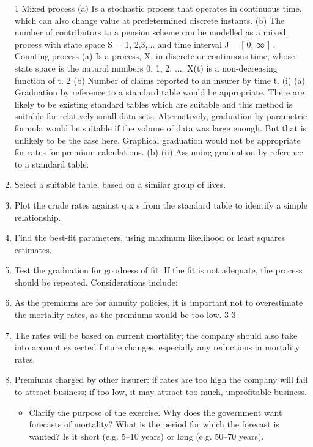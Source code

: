 \documentclass[a4paper,12pt]{article}
\begin{document}
\begin{enumerate}
1
Mixed process
(a) Is a stochastic process that operates in continuous time, which can also change
value at predetermined discrete instants.
(b) The number of contributors to a pension scheme can be modelled as a mixed
process with state space S = { 1, 2,3,... } and time interval J = [ 0, ∞ ] .
Counting process
(a)
Is a process, X, in discrete or continuous time, whose state space is the natural
numbers {0, 1, 2, ...}.
X(t) is a non-decreasing function of t.
2
(b) Number of claims reported to an insurer by time t.
(i) (a)
Graduation by reference to a standard table would be appropriate.
There are likely to be existing standard tables which are suitable and
this method is suitable for relatively small data sets.
Alternatively, graduation by parametric formula would be suitable if
the volume of data was large enough. But that is unlikely to be the
case here.
Graphical graduation would not be appropriate for rates for premium
calculations.
(b)
(ii)
Assuming graduation by reference to a standard table:
\item Select a suitable table, based on a similar group of lives.
\item Plot the crude rates against q x s from the standard table to identify a
simple relationship.
\item Find the best-fit parameters, using maximum likelihood or least
squares estimates.
\item Test the graduation for goodness of fit. If the fit is not adequate,
the process should be repeated.
Considerations include:
\item
As the premiums are for annuity policies, it is important not to
overestimate the mortality rates, as the premiums would be too low.
3
3
\item The rates will be based on current mortality; the company should also take
into account expected future changes, especially any reductions in
mortality rates.
\item Premiums charged by other insurer: if rates are too high the company will
fail to attract business; if too low, it may attract too much, unprofitable
business.
\begin{itemize}
\item Clarify the purpose of the exercise. Why does the government want forecasts of
mortality? What is the period for which the forecast is wanted? Is it short (e.g. 5–10
years) or long (e.g. 50–70 years).

\end{itemize}
\end{enumerate}
\end{document}
